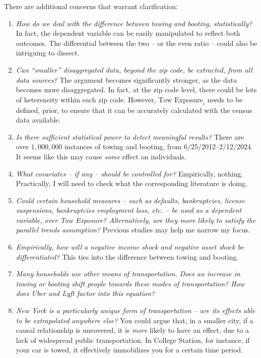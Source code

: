 \documentclass[12pt,letterpaper,doublespace, oneside]{article}
\begin{document}
There are additional concerns that warrant clarification:
\begin{enumerate}
\item \emph{How do we deal with the difference between towing and booting, statistically?} In fact, the dependent variable can be easily manipulated to reflect both outcomes. The differential between the two -- or the even ratio -- could also be intriguing to dissect.
\item \emph{Can \enquote{smaller} disaggregated data, beyond the zip code, be extracted, from all data sources?} The argument becomes significantly stronger, as the data becomes more disaggregated. In fact, at the zip code level, there could be lots of hetereneity within each zip code. However, $\text{Tow Exposure}_i$ needs to be defined, prior, to ensure that it can be accurately calculated with the census data available. 
\item \emph{Is there sufficient statistical power to detect meaningful results?} There are over $1,000,000$ instances of towing and booting, from 6/25/2012--2/12/2024. It seems like this may cause \emph{some} effect on individuals. 
\item \emph{What covariates -- if any -- should be controlled for?} Empirically, nothing. Practically, I will need to check what the corresponding literature is doing. 
\item \emph{Could certain household measures -- such as defaults, bankruptcies, license suspensions, bankruptcies employment loss, etc. -- be used as a dependent variable, over Tow Exposure? Alternatively, are they more likely to satisfy the parallel trends assumption?} Previous studies may help me narrow my focus.
\item \emph{Empirically, how will a negative income shock and negative asset shock be differentiated?} This ties into the difference between towing and booting. 
\item \emph{Many households use other means of transportation. Does an increase in towing or booting shift people towards these modes of transportation? How does Uber and Lyft factor into this equation?}
\item \emph{New York is a particularly unique form of transportation -- are its effects able to be extrapolated anywhere else?} You could argue that, in a smaller city, if a causal relationship is uncovered, it is \emph{more} likely to have an effect, due to a lack of widespread public transportation. In College Station, for instance, if your car is towed, it effectively immobilizes you for a certain time period.
\end{enumerate}
\end{document}
